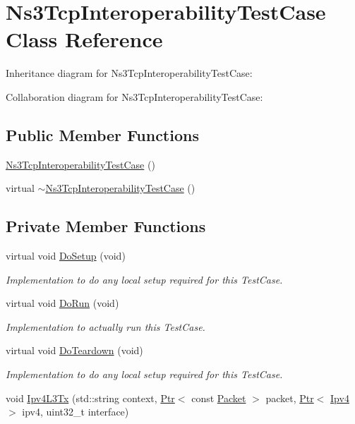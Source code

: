 \hypertarget{classNs3TcpInteroperabilityTestCase}{}\section{Ns3\+Tcp\+Interoperability\+Test\+Case Class Reference}
\label{classNs3TcpInteroperabilityTestCase}


Inheritance diagram for Ns3\+Tcp\+Interoperability\+Test\+Case\+:


Collaboration diagram for Ns3\+Tcp\+Interoperability\+Test\+Case\+:
\subsection*{Public Member Functions}
\begin{DoxyCompactItemize}
\item 
\hyperlink{classNs3TcpInteroperabilityTestCase_a3c5048146cfa7ab2b9de2d26c48c3941}{Ns3\+Tcp\+Interoperability\+Test\+Case} ()
\item 
virtual \hyperlink{classNs3TcpInteroperabilityTestCase_a8038aaedd04e5e09359c873490270b53}{$\sim$\+Ns3\+Tcp\+Interoperability\+Test\+Case} ()
\end{DoxyCompactItemize}
\subsection*{Private Member Functions}
\begin{DoxyCompactItemize}
\item 
virtual void \hyperlink{classNs3TcpInteroperabilityTestCase_af18785722baa5f4826f281efacaabe60}{Do\+Setup} (void)
\begin{DoxyCompactList}\small\item\em Implementation to do any local setup required for this Test\+Case. \end{DoxyCompactList}\item 
virtual void \hyperlink{classNs3TcpInteroperabilityTestCase_a7d5f4739d69bd8ba54b091dd83da6d4a}{Do\+Run} (void)
\begin{DoxyCompactList}\small\item\em Implementation to actually run this Test\+Case. \end{DoxyCompactList}\item 
virtual void \hyperlink{classNs3TcpInteroperabilityTestCase_a13a91d5f3882d3ac42448bcc29ebcbfd}{Do\+Teardown} (void)
\begin{DoxyCompactList}\small\item\em Implementation to do any local setup required for this Test\+Case. \end{DoxyCompactList}\item 
void \hyperlink{classNs3TcpInteroperabilityTestCase_a22015819cad44a2e3ebbecddc8b14458}{Ipv4\+L3\+Tx} (std\+::string context, \hyperlink{classns3_1_1Ptr}{Ptr}$<$ const \hyperlink{classns3_1_1Packet}{Packet} $>$ packet, \hyperlink{classns3_1_1Ptr}{Ptr}$<$ \hyperlink{classns3_1_1Ipv4}{Ipv4} $>$ ipv4, uint32\+\_\+t interface)
\end{DoxyCompactItemize}
